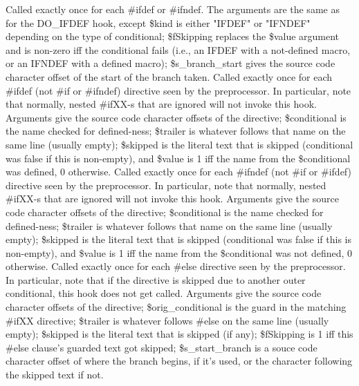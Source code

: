 Called exactly once for each \#ifdef or \#ifndef.
The arguments are the same as for the DO\_\-IFDEF hook, except \$kind is either
"IFDEF" or "IFNDEF" depending on the type of conditional; \$fSkipping
replaces the \$value argument and is non-zero iff the conditional fails
(i.e., an IFDEF with a not-defined macro, or an IFNDEF with a defined macro);
\$s\_\-branch\_\-start gives the source code character offset of the start of
the branch taken.
Called exactly once for each \#ifdef
(not \#if or \#ifndef) directive seen by the preprocessor. In particular,
note that normally, nested \#ifXX-s that are ignored will not invoke this hook.
Arguments give the source code character
offsets of the directive; \$conditional is the name checked for defined-ness;
\$trailer is whatever follows that name on the same line (usually empty); \$skipped is
the literal text that is skipped (conditional was false if this is non-empty), and
\$value is 1 iff the name from the \$conditional was defined, 0 otherwise.
Called exactly once for each \#ifndef
(not \#if or \#ifdef) directive seen by the preprocessor. In particular,
note that normally, nested \#ifXX-s that are ignored will not invoke this hook.
Arguments give the source code character
offsets of the directive; \$conditional is the name checked for defined-ness;
\$trailer is whatever follows that name on the same line (usually empty); \$skipped is
the literal text that is skipped (conditional was false if this is non-empty), and
\$value is 1 iff the name from the \$conditional was not defined, 0 otherwise.
Called exactly once for each \#else directive seen by the preprocessor. In particular,
note that if the directive is skipped due to another outer conditional, this
hook does not get called.
Arguments give the source code character
offsets of the directive; \$orig\_\-conditional is the guard in the
matching \#ifXX directive; 
\$trailer is whatever follows \#else on the same line (usually empty); \$skipped is
the literal text that is skipped (if any); \$fSkipping is 1 iff
this \#else clause's guarded text got skipped; \$s\_\-start\_\-branch is a souce code
character offset of where the branch begins, if it's used, or the character
following the skipped text if not.

